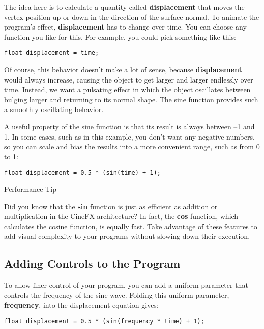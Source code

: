 \documentclass[../main.tex]{subfiles}
\begin{document}
The idea here is to calculate a quantity called \textbf{displacement} that moves the vertex position up or down in the direction of the surface normal. To animate the program's effect, \textbf{displacement} has to change over time. You can choose any function you like for this. For example, you could pick something like this:

\FloatBarrier
\begin{lstlisting}
float displacement = time;
\end{lstlisting}
\FloatBarrier

Of course, this behavior doesn't make a lot of sense, because \textbf{displacement} would always increase, causing the object to get larger and larger endlessly over time. Instead, we want a pulsating effect in which the object oscillates between bulging larger and returning to its normal shape. The sine function provides such a smoothly oscillating behavior.

A useful property of the sine function is that its result is always between –1 and 1. In some cases, such as in this example, you don't want any negative numbers, so you can scale and bias the results into a more convenient range, such as from 0 to 1:

\FloatBarrier
\begin{lstlisting}
float displacement = 0.5 * (sin(time) + 1);
\end{lstlisting}
\FloatBarrier

\begin{framed}
Performance Tip

Did you know that the \textbf{sin} function is just as efficient as addition or multiplication in the CineFX architecture? In fact, the \textbf{cos} function, which calculates the cosine function, is equally fast. Take advantage of these features to add visual complexity to your programs without slowing down their execution.
\end{framed}

\subsection*{Adding Controls to the Program}

To allow finer control of your program, you can add a uniform parameter that controls the frequency of the sine wave. Folding this uniform parameter, \textbf{frequency}, into the displacement equation gives:

\FloatBarrier
\begin{lstlisting}
float displacement = 0.5 * (sin(frequency * time) + 1);
\end{lstlisting}
\FloatBarrier
\end{document}
